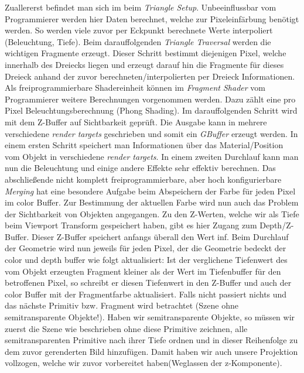         Zuallererst befindet man sich im  beim \textit{Triangle Setup}. Unbeeinflussbar vom Programmierer werden hier Daten berechnet, welche zur Pixeleinfärbung
        benötigt werden. So werden viele zuvor per Eckpunkt berechnete Werte interpoliert (Beleuchtung, Tiefe). Beim darauffolgenden \textit{Triangle Traversal} werden
        die wichtigen Fragmente erzeugt. Dieser Schritt bestimmt diejenigen Pixel, welche innerhalb des Dreiecks liegen und erzeugt darauf hin die Fragmente für dieses
        Dreieck anhand der zuvor berechneten/interpolierten per Dreieck Informationen. Als freiprogrammierbare Shadereinheit können im \textit{Fragment Shader}
        vom Programmierer weitere Berechnungen vorgenommen werden. Dazu zählt eine pro Pixel Beleuchtungsberechnung (Phong Shading).
        Im darauffolgenden Schritt wird mit dem Z-Buffer auf Sichtbarkeit geprüft. Die Ausgabe kann in mehrere verschiedene \textit{render targets}
        geschrieben und somit ein \textit{GBuffer} erzeugt werden. In einem ersten Schritt speichert man Informationen
        über das Material/Position vom Objekt in verschiedene \textit{render targets}. In einem zweiten Durchlauf kann man nun die Beleuchtung und einige andere 
        Effekte sehr effektiv berechnen.  
        Das abschließende nicht komplett freiprogrammierbare, aber hoch konfigurierbare \textit{Merging} hat eine besondere Aufgabe beim Abspeichern der Farbe für
        jeden Pixel im color Buffer. Zur Bestimmung der aktuellen Farbe wird nun auch das Problem der 
        Sichtbarkeit von Objekten angegangen. Zu den Z-Werten, welche wir als Tiefe beim Viewport Transform gespeichert haben, gibt
        es hier Zugang zum Depth/Z-Buffer. Dieser Z-Buffer speichert anfangs überall den Wert inf. Beim Durchlauf der Geometrie wird nun jeweils für jeden Pixel,
        der die Geometrie bedeckt der color und depth buffer wie folgt aktualisiert: Ist der verglichene Tiefenwert des vom Objekt erzeugten Fragment kleiner als der Wert
        im Tiefenbuffer für den betroffenen Pixel, so schreibt er diesen Tiefenwert in den Z-Buffer und auch der color Buffer mit der Fragmentfarbe aktualisiert.
        Falls nicht passiert nichts und das nächste Primitiv bzw. Fragment wird betrachtet (Szene ohne semitransparente Objekte!). Haben wir semitransparente Objekte, so 
        müssen wir zuerst die Szene wie beschrieben ohne diese Primitive zeichnen, alle semitransparenten Primitive nach ihrer Tiefe ordnen und in dieser Reihenfolge 
        zu dem zuvor gerenderten Bild hinzufügen. Damit haben wir auch unsere Projektion vollzogen, welche wir zuvor vorbereitet 
        haben(Weglassen der z-Komponente).\par 

